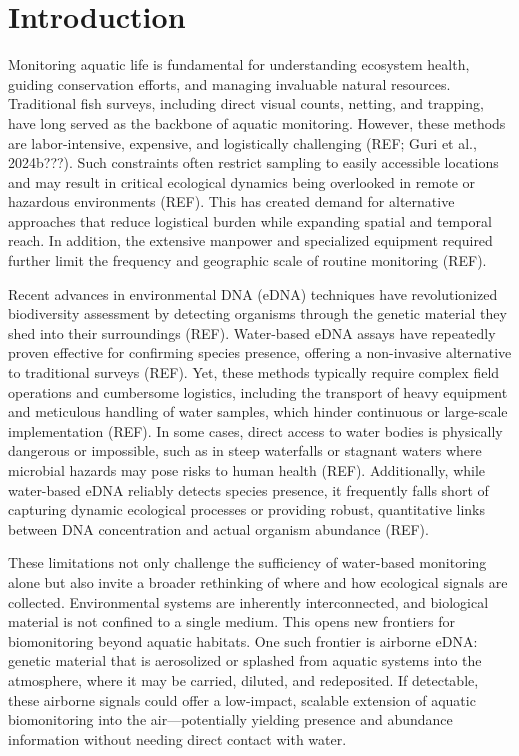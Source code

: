 \documentclass{article}
\begin{document}
\section{Introduction}
Monitoring aquatic life is fundamental for understanding ecosystem health, guiding conservation efforts, and managing invaluable natural resources. Traditional fish surveys, including direct visual counts, netting, and trapping, have long served as the backbone of aquatic monitoring. However, these methods are labor-intensive, expensive, and logistically challenging (REF; Guri et al., 2024b???). Such constraints often restrict sampling to easily accessible locations and may result in critical ecological dynamics being overlooked in remote or hazardous environments (REF). This has created demand for alternative approaches that reduce logistical burden while expanding spatial and temporal reach. In addition, the extensive manpower and specialized equipment required further limit the frequency and geographic scale of routine monitoring (REF).  

Recent advances in environmental DNA (eDNA) techniques have revolutionized biodiversity assessment by detecting organisms through the genetic material they shed into their surroundings (REF). Water-based eDNA assays have repeatedly proven effective for confirming species presence, offering a non-invasive alternative to traditional surveys (REF). Yet, these methods typically require complex field operations and cumbersome logistics, including the transport of heavy equipment and meticulous handling of water samples, which hinder continuous or large-scale implementation (REF). In some cases, direct access to water bodies is physically dangerous or impossible, such as in steep waterfalls or stagnant waters where microbial hazards may pose risks to human health (REF). Additionally, while water-based eDNA reliably detects species presence, it frequently falls short of capturing dynamic ecological processes or providing robust, quantitative links between DNA concentration and actual organism abundance (REF).

These limitations not only challenge the sufficiency of water-based monitoring alone but also invite a broader rethinking of where and how ecological signals are collected. Environmental systems are inherently interconnected, and biological material is not confined to a single medium. This opens new frontiers for biomonitoring beyond aquatic habitats. One such frontier is airborne eDNA: genetic material that is aerosolized or splashed from aquatic systems into the atmosphere, where it may be carried, diluted, and redeposited. If detectable, these airborne signals could offer a low-impact, scalable extension of aquatic biomonitoring into the air—potentially yielding presence and abundance information without needing direct contact with water.
\end{document}
